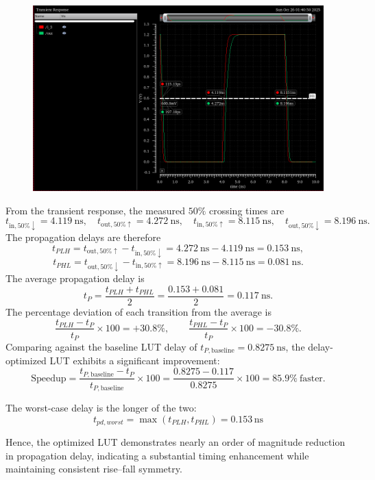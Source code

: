 \documentclass[12pt]{article}
\begin{document}
\begin{figure}[H]
    \centering
    \includegraphics[width=\linewidth]{writeup//figures/updated_delay_opt.png}
    \caption{}
\end{figure}
From the transient response, the measured $50\%$ crossing times are
\[
t_{\text{in},50\%\downarrow} = 4.119~\text{ns}, \quad
t_{\text{out},50\%\uparrow} = 4.272~\text{ns}, \quad
t_{\text{in},50\%\uparrow} = 8.115~\text{ns}, \quad
t_{\text{out},50\%\downarrow} = 8.196~\text{ns}.
\]
The propagation delays are therefore
\[
t_{PLH} = t_{\text{out},50\%\uparrow} - t_{\text{in},50\%\downarrow}
        = 4.272~\text{ns} - 4.119~\text{ns}
        = \boxed{0.153~\text{ns}},
\]
\[
t_{PHL} = t_{\text{out},50\%\downarrow} - t_{\text{in},50\%\uparrow}
        = 8.196~\text{ns} - 8.115~\text{ns}
        = \boxed{0.081~\text{ns}}.
\]
The average propagation delay is
\[
t_P = \frac{t_{PLH} + t_{PHL}}{2}
     = \frac{0.153 + 0.081}{2}
     = \boxed{0.117~\text{ns}}.
\]
The percentage deviation of each transition from the average is
\[
\frac{t_{PLH} - t_P}{t_P} \times 100 = \boxed{+30.8\%}, 
\qquad
\frac{t_{PHL} - t_P}{t_P} \times 100 = \boxed{-30.8\%}.
\]
Comparing against the baseline LUT delay of $t_{P,\text{baseline}} = 0.8275~\text{ns}$, the delay-optimized LUT exhibits a significant improvement:
\[
\text{Speedup} 
= \frac{t_{P,\text{baseline}} - t_P}{t_{P,\text{baseline}}} \times 100
= \frac{0.8275 - 0.117}{0.8275} \times 100
= \boxed{85.9\%~\text{faster}}.
\]

The worst-case delay is the longer of the two:
\[
t_{pd,worst} = \max(t_{PLH}, t_{PHL}) = 0.153\,\text{ns}
\]

Hence, the optimized LUT demonstrates nearly an order of magnitude reduction in propagation delay, indicating a substantial timing enhancement while maintaining consistent rise–fall symmetry.
\end{document}
